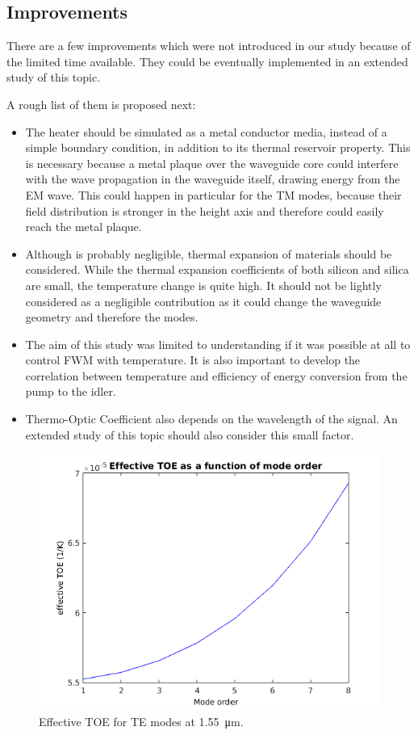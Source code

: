 \documentclass[12pt,a4paper,twoside]{article}
\begin{document}
\subsection{Improvements}

There are a few improvements which were not introduced in our study because of the limited time available.
They could be eventually implemented in an extended study of this topic.

A rough list of them is proposed next:
\begin{itemize}
\item	The heater should be simulated as a metal conductor media, instead of a simple boundary condition, in addition to its thermal reservoir property. This is necessary because a metal plaque over the waveguide core could interfere with the wave propagation in the waveguide itself, drawing energy from the EM wave. This could happen in particular for the TM modes, because their field distribution is stronger in the height axis and therefore could easily reach the metal plaque.

\item	Although is probably negligible, thermal expansion of materials should be considered.
While the thermal expansion coefficients of both silicon and silica are small, the temperature change is quite high.
It should not be lightly considered as a negligible contribution as it could change the waveguide geometry and therefore the modes.

\item	The aim of this study was limited to understanding if it was possible at all to control FWM with temperature.
It is also important to develop the correlation between temperature and efficiency of energy conversion from the pump to the idler.

\item	Thermo-Optic Coefficient also depends on the wavelength of the signal.
An extended study of this topic should also consider this small factor.
\end{itemize}

\begin{figure}[!ht]
	\centering
	\includegraphics[width=.75\textwidth]{TOEvariation.png}
	\caption{Effective TOE for TE modes at \SI{1.55}{\um}.}
	\label{fig_variation}
\end{figure}
\end{document}
